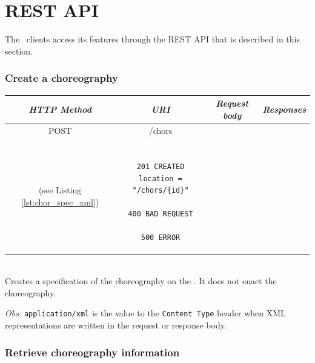 \section{REST API}
\label{sec:api}

The \ee\ clients access its features through the REST API that is described in this section.

\subsubsection*{Create a choreography}

\begin{tabular}{|c|c|c|c|}
\hline 
\itshape{HTTP Method} & \itshape{URI} & \itshape{Request body} & \itshape{Responses} \\ 
\hline 
POST & /chors & 

\begin{minipage}{2in}
\verb!ChorSpec! XML representation \\ 
(see Listing \ref{lst:chor_spec_xml})
\end{minipage} 
&

\begin{minipage}{2in}
\begin{verbatim}

201 CREATED
location = "/chors/{id}"

400 BAD REQUEST

500 ERROR

\end{verbatim}
\end{minipage} 
\\ 
\hline 
\end{tabular} \\

Creates a specification of the choreography on the \ee.
It does not enact the choreography. 

\emph{Obs:} \texttt{application/xml} is the value to the \texttt{Content Type} header when XML representations are written in the request or response body. 

\subsubsection*{Retrieve choreography information}

